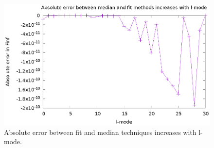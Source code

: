 \begin{figure}
  \includegraphics{absErrorIncreaseslmode}
  \caption{Absolute error between fit and median techniques increases with l-mode.}
\end{figure}




